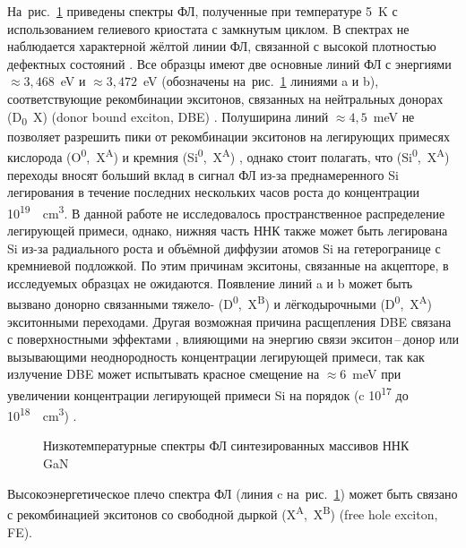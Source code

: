 На~рис.~\cref{fig:Image_30_1} приведены спектры ФЛ, полученные при температуре
5~\si{\kelvin} с использованием гелиевого криостата с замкнутым циклом. В
спектрах не наблюдается характерной жёлтой линии ФЛ, связанной с высокой
плотностью дефектных состояний \cite{Suski1995}. Все образцы имеют две основные
линий ФЛ с энергиями \(\approx 3,468\)~\si{\electronvolt} и \(\approx
3,472\)~\si{\electronvolt} (обозначены на~рис.~\cref{fig:Image_30_1} линиями a
и b), соответствующие рекомбинации экситонов, связанных на нейтральных донорах
(D\textsubscript{0}~X) (donor bound exciton, DBE) \cite{Bolshakov2018,
Paskov2004}. Полуширина линий \(\approx 4,5\)~\si{\milli\electronvolt} не
позволяет разрешить пики от рекомбинации экситонов на легирующих примесях
кислорода (O\textsuperscript{0},~X\textsuperscript{A}) и кремния
(Si\textsuperscript{0},~X\textsuperscript{A}) \cite{Zettler2015}, однако стоит
полагать, что (Si\textsuperscript{0},~X\textsuperscript{A}) переходы вносят
больший вклад в сигнал ФЛ из-за преднамеренного Si легирования в течение
последних нескольких часов роста до концентрации
10\textsuperscript{19}~\si{\per\centi\metre\cubed}. В данной работе не
исследовалось пространственное распределение легирующей примеси, однако, нижняя
часть ННК также может быть легирована Si из-за радиального роста и объёмной
диффузии атомов Si на гетерогранице с кремниевой подложкой. По этим причинам
экситоны, связанные на акцепторе, в исследуемых образцах не ожидаются.
Появление линий a и b может быть вызвано донорно связанными тяжело-
(D\textsuperscript{0},~X\textsuperscript{B}) и лёгкодырочными
(D\textsuperscript{0},~X\textsuperscript{A}) экситонными переходами. Другая
возможная причина расщепления DBE связана с поверхностными эффектами
\cite{Calarco2011}, влияющими на энергию связи экситон\,--\,донор или
вызывающими неоднородность концентрации легирующей примеси, так как излучение
DBE может испытывать красное смещение на \(\approx 6\)~\si{\milli\electronvolt}
при увеличении концентрации легирующей примеси Si на порядок (c
10\textsuperscript{17} до 10\textsuperscript{18}~\si{\per\centi\metre\cubed})
\cite{Pozina2011}.

\begin{figure}[ht]  \caption{Низкотемпературные
спектры ФЛ синтезированных массивов ННК GaN}\label{fig:Image_30_1} \end{figure}

Высокоэнергетическое плечо спектра ФЛ (линия c на~рис.~\cref{fig:Image_30_1})
может быть связано с рекомбинацией экситонов со свободной дыркой
(X\textsuperscript{A},~X\textsuperscript{B}) (free hole exciton, FE).

